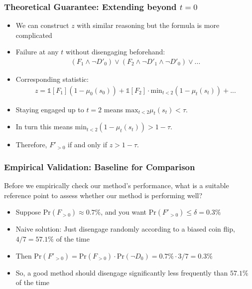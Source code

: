 \documentclass[handout]{beamer}
\begin{document}
\begin{frame}
    \frametitle{Theoretical Guarantee: Extending beyond $t=0$}

    \begin{itemize}
    \item We can construct $z$ with similar reasoning but the formula is more complicated\pause
    \item Failure at any $t$ without disengaging beforehand:
    \begin{align}
    (F_1\wedge \neg D'_0) \vee (F_2\wedge\neg D'_1\wedge \neg D'_0) \vee ... %
    \end{align}\pause
    \item Corresponding statistic:
    \begin{align}
    z = \mathbb{1}[F_1](1 - \mu_0(s_0)) + \mathbb{1}[F_2]\cdot\text{min}_{t<2}(1-\mu_t(s_t)) + ...
    \end{align}\pause
    \item Staying engaged up to $t=2$ means $\text{max}_{t<2}\mu_t(s_t) < \tau$.
    \item In turn this means $\text{min}_{t<2}(1-\mu_t(s_t)) > 1 - \tau$.
    \item Therefore, $F'_{>0}$ if and only if $z > 1 - \tau$.
    \end{itemize}

\end{frame}

\begin{frame}
    \frametitle{Empirical Validation: Baseline for Comparison}

    Before we empirically check our method's performance, what is a suitable reference point to assess whether our method is performing well?

    \begin{itemize}
    \item Suppose $\text{Pr}(F_{>0}) \approx 0.7\%$, and you want $\text{Pr}(F'_{>0}) \leq \delta = 0.3\%$

    \item Naive solution: Just disengage randomly according to a biased coin flip, $4/7 = 57.1\%$ of the time
    
    \item Then $\text{Pr}(F'_{>0}) = \text{Pr}(F_{>0})\cdot\text{Pr}(\neg D_0) = 0.7\% \cdot 3/7 = 0.3\%$

    \item So, a good method should disengage significantly less frequently than $57.1\%$ of the time
    \end{itemize}

\end{frame}
\end{document}
